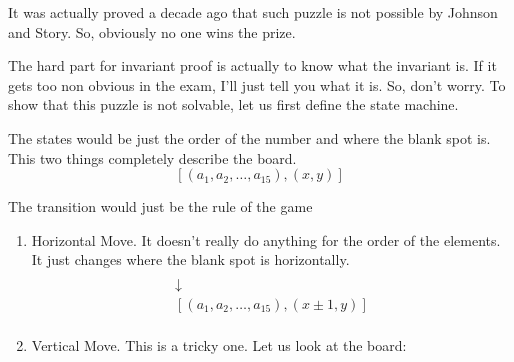 \documentclass[a4paper, 12pt]{article}
\theoremstyle{examplestyle}
\begin{document}
\begin{multicols}{2}
\begin{center}
\end{center}
It was actually proved a decade ago that such puzzle is not possible by Johnson and Story. So, obviously no one wins the prize.

The hard part for invariant proof is actually to know what the invariant is. If it gets too non obvious in the exam, I'll just tell you what it is. So, don't worry. To show that this puzzle is not solvable, let us first define the state machine.

The states would be just the order of the number and where the blank spot is. This two things completely describe the board.
\[
	[ (a_1, a_2, \ldots, a_{15}), (x,y) ]
\]

The transition would just be the rule of the game
\begin{enumerate}
	\item Horizontal Move. It doesn't really do anything for the order of the elements. It just changes where the blank spot is horizontally.
	\begin{gather*}
	[ (a_1, a_2, \ldots, a_{15}), (x,y) ]\\
	\downarrow\\
	[ (a_1, a_2, \ldots, a_{15}), (x \pm 1,y) ]	\\
	\end{gather*}
	
	\item Vertical Move. This is a tricky one. Let us look at the board:
	

\end{enumerate}
\end{multicols}
\end{document}
